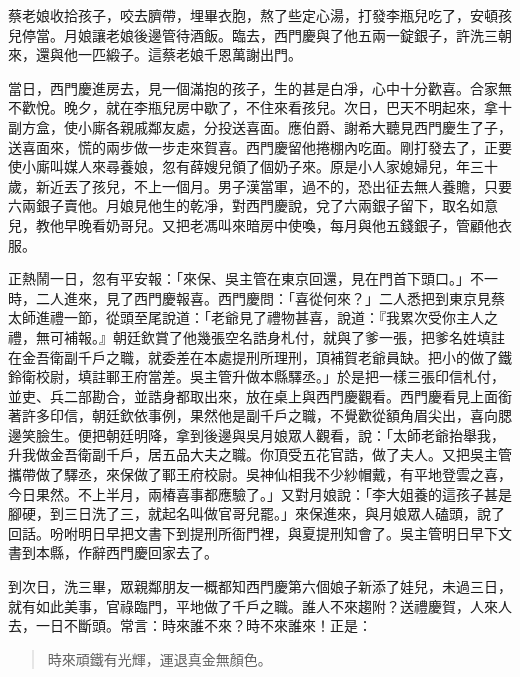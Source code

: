 蔡老娘收拾孩子，咬去臍帶，埋畢衣胞，熬了些定心湯，打發李瓶兒吃了，安頓孩兒停當。月娘讓老娘後邊管待酒飯。臨去，西門慶與了他五兩一錠銀子，許洗三朝來，還與他一匹緞子。這蔡老娘千恩萬謝出門。

當日，西門慶進房去，見一個滿抱的孩子，生的甚是白凈，心中十分歡喜。合家無不歡悅。晚夕，就在李瓶兒房中歇了，不住來看孩兒。次日，巴天不明起來，拿十副方盒，使小廝各親戚鄰友處，分投送喜面。應伯爵、謝希大聽見西門慶生了子，送喜面來，慌的兩步做一步走來賀喜。西門慶留他捲棚內吃面。剛打發去了，正要使小廝叫媒人來尋養娘，忽有薛嫂兒領了個奶子來。原是小人家媳婦兒，年三十歲，新近丟了孩兒，不上一個月。男子漢當軍，過不的，恐出征去無人養贍，只要六兩銀子賣他。月娘見他生的乾凈，對西門慶說，兌了六兩銀子留下，取名如意兒，教他早晚看奶哥兒。又把老馮叫來暗房中使喚，每月與他五錢銀子，管顧他衣服。

正熱鬧一日，忽有平安報：「來保、吳主管在東京回還，見在門首下頭口。」不一時，二人進來，見了西門慶報喜。西門慶問：「喜從何來？」二人悉把到東京見蔡太師進禮一節，從頭至尾說道：「老爺見了禮物甚喜，說道：『我累次受你主人之禮，無可補報。』朝廷欽賞了他幾張空名誥身札付，就與了爹一張，把爹名姓填註在金吾衛副千戶之職，就委差在本處提刑所理刑，頂補賀老爺員缺。把小的做了鐵鈴衛校尉，填註鄆王府當差。吳主管升做本縣驛丞。」於是把一樣三張印信札付，並吏、兵二部勘合，並誥身都取出來，放在桌上與西門慶觀看。西門慶看見上面銜著許多印信，朝廷欽依事例，果然他是副千戶之職，不覺歡從額角眉尖出，喜向腮邊笑臉生。便把朝廷明降，拿到後邊與吳月娘眾人觀看，說：「太師老爺抬舉我，升我做金吾衛副千戶，居五品大夫之職。你頂受五花官誥，做了夫人。又把吳主管攜帶做了驛丞，來保做了鄆王府校尉。吳神仙相我不少紗帽戴，有平地登雲之喜，今日果然。不上半月，兩椿喜事都應驗了。」又對月娘說：「李大姐養的這孩子甚是腳硬，到三日洗了三，就起名叫做官哥兒罷。」來保進來，與月娘眾人磕頭，說了回話。吩咐明日早把文書下到提刑所衙門裡，與夏提刑知會了。吳主管明日早下文書到本縣，作辭西門慶回家去了。

到次日，洗三畢，眾親鄰朋友一概都知西門慶第六個娘子新添了娃兒，未過三日，就有如此美事，官祿臨門，平地做了千戶之職。誰人不來趨附？送禮慶賀，人來人去，一日不斷頭。常言：時來誰不來？時不來誰來！正是：
\begin{quote}
時來頑鐵有光輝，運退真金無顏色。
\end{quote}
